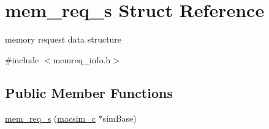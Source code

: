 \hypertarget{structmem__req__s}{
\section{mem\_\-req\_\-s Struct Reference}
\label{structmem__req__s}
}


memory request data structure  




{\ttfamily \#include $<$memreq\_\-info.h$>$}

\subsection*{Public Member Functions}
\begin{DoxyCompactItemize}
\item 
\hyperlink{structmem__req__s_a8adcd0b63a42bd45874514db51e5500d}{mem\_\-req\_\-s} (\hyperlink{classmacsim__c}{macsim\_\-c} $\ast$simBase)
\end{DoxyCompactItemize}
